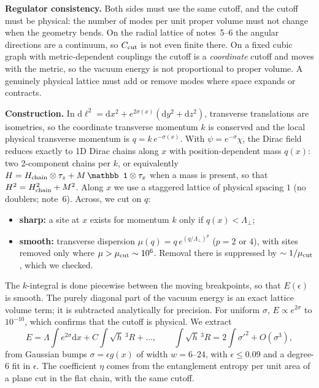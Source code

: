 \documentclass[11pt]{article}
\newcommand{\dd}{\mathrm{d}}
\begin{document}
\textbf{Regulator consistency.} Both sides must use the same cutoff, and the cutoff must be physical: the number of modes per unit proper volume must not change when the geometry bends. On the radial lattice of notes~5--6 the angular directions are a continuum, so $C_{\rm cut}$ is not even finite there. On a fixed cubic graph with metric-dependent couplings the cutoff is a \emph{coordinate} cutoff and moves with the metric, so the vacuum energy is not proportional to proper volume. A genuinely physical lattice must add or remove modes where space expands or contracts.

\textbf{Construction.} In $\dd\ell^2=\dd x^2+e^{2\sigma(x)}(\dd y^2+\dd z^2)$, transverse translations are isometries, so the coordinate transverse momentum $k$ is conserved and the local physical transverse momentum is $q=k\,e^{-\sigma(x)}$. With $\psi=e^{-\sigma}\chi$, the Dirac field reduces exactly to 1D Dirac chains along $x$ with position-dependent mass $q(x)$: two 2-component chains per $k$, or equivalently $H=H_{\rm chain}\otimes\tau_z+M\,\mathbb 1\otimes\tau_x$ when a mass is present, so that $H^2=H_{\rm chain}^2+M^2$. Along $x$ we use a staggered lattice of physical spacing $1$ (no doublers; note~6). Across, we cut on $q$:
\begin{itemize}
\item \textbf{sharp:} a site at $x$ exists for momentum $k$ only if $q(x)<\Lambda_\perp$;
\item \textbf{smooth:} transverse dispersion $\mu(q)=q\,e^{(q/\Lambda_\perp)^p}$ ($p=2$ or $4$), with sites removed only where $\mu>\mu_{\rm cut}\sim10^{6}$. Removal there is suppressed by $\sim1/\mu_{\rm cut}$, which we checked.
\end{itemize}
The $k$-integral is done piecewise between the moving breakpoints, so that $E(\epsilon)$ is smooth. The purely diagonal part of the vacuum energy is an exact lattice volume term; it is subtracted analytically for precision. For uniform $\sigma$, $E\propto e^{2\sigma}$ to $10^{-10}$, which confirms that the cutoff is physical. We extract
\begin{equation}
E=\Lambda\!\int\! e^{2\sigma}\dd x+C\!\int\!\sqrt h\,{}^3\!R+\dots,\qquad \int\!\sqrt h\,{}^3\!R=2\!\int\!\sigma'^2+O(\sigma^3),
\end{equation}
from Gaussian bumps $\sigma=\epsilon g(x)$ of width $w=6$--$24$, with $\epsilon\le0.09$ and a degree-6 fit in $\epsilon$. The coefficient $\eta$ comes from the entanglement entropy per unit area of a plane cut in the flat chain, with the same cutoff.
\end{document}
